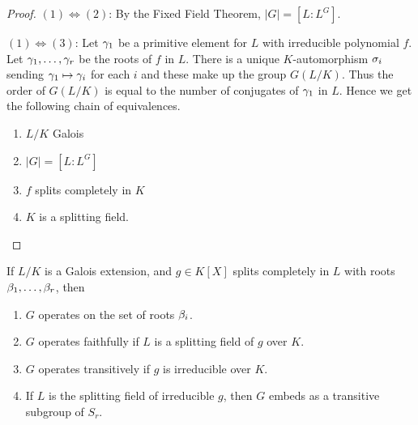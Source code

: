 \begin{proof}
$(1)\iff (2)$: By the Fixed Field Theorem, $|G|=[L:L^G]$.

$(1)\iff (3)$: Let $\gamma_1$ be a primitive element for $L$ with irreducible polynomial $f$. Let $\gamma_1,\ldots, \gamma_r$ be the roots of $f$ in $L$. There is a unique $K$-automorphism $\sigma_i$ sending $\gamma_1\mapsto \gamma_i$ for each $i$ and these make up the group $G(L/K)$. Thus the order of $G(L/K)$ is equal to the number of conjugates of $\gamma_1$ in $L$. Hence we get the following chain of equivalences.
\begin{enumerate}
\item
$L/K$ Galois
\item 
$|G|=[L:L^G]$
\item
$f$ splits completely in $K$
\item
$K$ is a splitting field.
\end{enumerate}
\end{proof}
\begin{pr}
If $L/K$ is a Galois extension, and $g\in K[X]$ splits completely in $L$ with roots $\beta_1,\ldots, \beta_r$, then
\begin{enumerate}
\item
$G$ operates on the set of roots $\beta_i$.
\item
$G$ operates faithfully if $L$ is a splitting field of $g$ over $K$.
\item
$G$ operates transitively if $g$ is irreducible over $K$.
\item
If $L$ is the splitting field of irreducible $g$, then $G$ embeds as a transitive subgroup of $S_r$.
\end{enumerate}
\end{pr}
